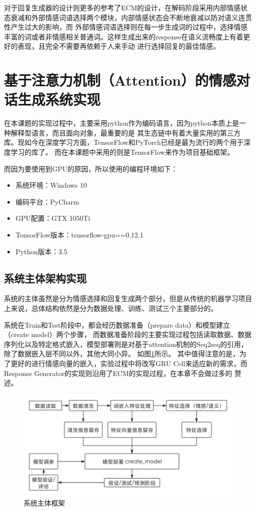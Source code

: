 \documentclass[supercite]{HustGraduPaper}
\theoremstyle{definition}
\begin{document}
对于回复生成器的设计则更多的参考了ECM\cite{DBLP:journals/corr/ZhouHZZL17}的设计，在解码阶段采用内部情感状态衰减和外部情感词语选择两个模块，内部情感状态会不断地衰减以防对语义连贯性产生过大的影响，而
外部情感词语选择则在每一步生成词的过程中，选择情感丰富的词或者非情感相关普通词。这样生成出来的response在语义流畅度上有着更好的表现，且完全不需要再依赖于人来手动
进行选择回复的最佳情感。

\section{基于注意力机制（Attention）的情感对话生成系统实现}
在本课题的实现过程中，主要采用python作为编码语言，因为python本质上是一种解释型语言，而且面向对象，最重要的是
其生态链中有着大量实用的第三方库。现如今在深度学习方面，TensorFlow和PyTorch已经是最为流行的两个用于深度学习的库了。
而在本课题中采用的则是TensorFlow来作为项目基础框架。

而因为要使用到GPU的原因，所以使用的编程环境如下：
\begin{itemize}
  \item 系统环境：Windows 10
  \item 编码平台：PyCharm
  \item GPU配置：GTX 1050Ti
  \item TensorFlow版本：tensorflow-gpu==0.12.1
  \item Python版本：3.5
\end{itemize}

\subsection{系统主体架构实现}
系统的主体虽然是分为情感选择和回复生成两个部分，但是从传统的机器学习项目上来说，总体结构依然是分为数据处理、训练、测试三个主要部分的。

系统在Train和Test阶段中，都会经历数据准备（prepare data）和模型建立（create model）两个步骤，
而数据准备阶段的主要实现过程包括读取数据、数据序列化以及特定格式嵌入，模型部署则是对基于attention机制的Seq2seq的引用，除了数据嵌入层不同以外，其他大同小异。
如图\ref{Fig.main}所示。
其中值得注意的是，为了更好的进行情感向量的嵌入，实验过程中将改写GRU Cell来适应新的需求，而Response Generator的实现则沿用了ECM的实现过程，在本章不会做过多的
赘述。
\begin{figure}[H] %
  \centering %
  \includegraphics[width=1\textwidth]{images/main.png} %
  \caption{系统主体框架} %
  \label{Fig.main} %
\end{figure}
\end{document}
